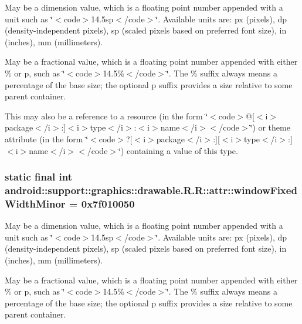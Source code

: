 May be a dimension value, which is a floating point number appended with a unit such as \char`\"{}$<$code$>$14.5sp$<$/code$>$\char`\"{}. Available units are: px (pixels), dp (density-independent pixels), sp (scaled pixels based on preferred font size), in (inches), mm (millimeters). 

May be a fractional value, which is a floating point number appended with either \% or p, such as \char`\"{}$<$code$>$14.5\%$<$/code$>$\char`\"{}. The \% suffix always means a percentage of the base size; the optional p suffix provides a size relative to some parent container. 

This may also be a reference to a resource (in the form \char`\"{}$<$code$>$@\mbox{[}$<$i$>$package$<$/i$>$:\mbox{]}$<$i$>$type$<$/i$>$:$<$i$>$name$<$/i$>$$<$/code$>$\char`\"{}) or theme attribute (in the form \char`\"{}$<$code$>$?\mbox{[}$<$i$>$package$<$/i$>$:\mbox{]}\mbox{[}$<$i$>$type$<$/i$>$:\mbox{]}$<$i$>$name$<$/i$>$$<$/code$>$\char`\"{}) containing a value of this type. \hypertarget{classandroid_1_1support_1_1graphics_1_1drawable_1_1_r_1_1attr_7382f22cefa347208406622d5de4a904}{
\subsubsection[{windowFixedWidthMinor}]{\setlength{\rightskip}{0pt plus 5cm}static final int android::support::graphics::drawable.R.R::attr::windowFixedWidthMinor = 0x7f010050}}
\label{classandroid_1_1support_1_1graphics_1_1drawable_1_1_r_1_1attr_7382f22cefa347208406622d5de4a904}


May be a dimension value, which is a floating point number appended with a unit such as \char`\"{}$<$code$>$14.5sp$<$/code$>$\char`\"{}. Available units are: px (pixels), dp (density-independent pixels), sp (scaled pixels based on preferred font size), in (inches), mm (millimeters). 

May be a fractional value, which is a floating point number appended with either \% or p, such as \char`\"{}$<$code$>$14.5\%$<$/code$>$\char`\"{}. The \% suffix always means a percentage of the base size; the optional p suffix provides a size relative to some parent container. 


